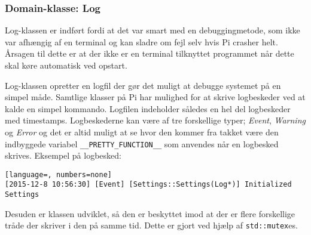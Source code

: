 \subsubsection{Domain-klasse: Log} \label{sec:log_klasse}
Log-klassen er indført fordi at det var smart med en debuggingmetode, som ikke var afhængig af en terminal og kan sladre om fejl selv hvis Pi crasher helt.
Årsagen til dette er at der ikke er en terminal tilknyttet programmet når dette skal køre automatisk ved opstart.

Log-klassen opretter en logfil der gør det muligt at debugge systemet på en simpel måde. Samtlige klasser på Pi har mulighed for at skrive logbeskeder ved at kalde en simpel kommando. Logfilen indeholder således en hel del logbeskeder med timestamps. Logbeskederne kan være af tre forskellige typer; \textit{Event}, \textit{Warning} og \textit{Error} og det er altid muligt at se hvor den kommer fra takket være den indbyggede variabel \texttt{\_\_PRETTY\_FUNCTION\_\_} \cite{lib:prettyf} som anvendes når en logbesked skrives. Eksempel på logbesked:

\begin{lstlisting}[language=, numbers=none]
[2015-12-8 10:56:30] [Event] [Settings::Settings(Log*)] Initialized Settings
\end{lstlisting}

Desuden er klassen udviklet, så den er beskyttet imod at der er flere forskellige tråde der skriver i den på samme tid. Dette er gjort ved hjælp af \texttt{std::mutex}es.